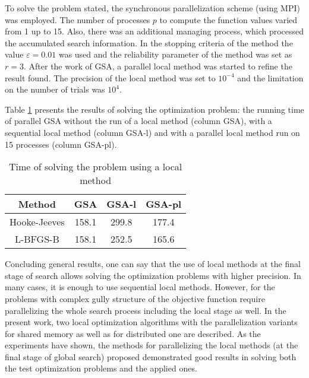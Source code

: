 \documentclass[runningheads]{llncs}
\begin{document}
To solve the problem stated, the synchronous parallelization scheme (using MPI) was employed. The number of processes $p$ to compute the function values varied from 1 up to 15. Also, there was an additional managing process, which processed the accumulated search information. In the stopping criteria of the method the value $\varepsilon=0.01$ was used and the reliability parameter of the method was set as $r = 3$. After the work of GSA, a parallel local method was started to refine the result found. The precision of the local method was set to $10^{-4}$ and the limitation on the number of trials was $10^4$. 

%

Table \ref{tab:12} presents the results of solving the optimization problem: the running time of parallel GSA without the run of a local method (column GSA), with a sequential local method (column GSA-l) and with a parallel local method run on 15 processes (column GSA-pl).

\begin{table}[ht]
	\caption{Time of solving the problem using a local method}
	\label{tab:12}
	\center
		\begin{tabular}{|c|c|c|c|}
		\hline
		Method & GSA & GSA-l & GSA-pl \\
		\hline 
		Hooke-Jeeves & 158.1 & 299.8  & 177.4 \\
		\hline
		L-BFGS-B & 158.1  & 252.5  & 165.6  \\
		\hline
	\end{tabular}
\end{table}

Concluding general results, one can say that the use of local methods at the final stage of search allows solving the optimization problems with higher precision. In many cases, it is enough to use sequential local methods. However, for the problems with complex gully structure of the objective function require parallelizing the whole search process including the local stage as well. In the present work, two local optimization algorithms with the parallelization variants for shared memory as well as for distributed one are described. As the experiments have shown, the methods for parallelizing the local methods (at the final stage of global search) proposed demonstrated good results in solving both the test optimization problems and the applied ones. 
\end{document}
